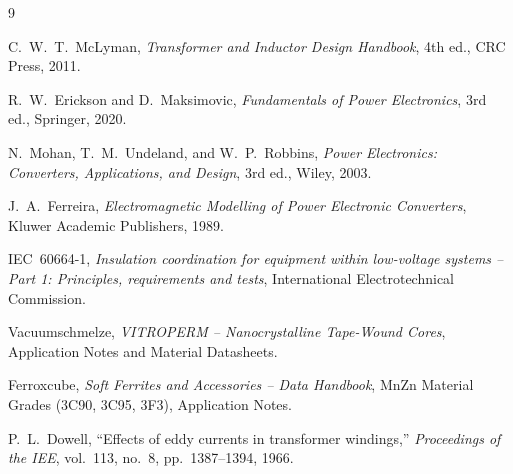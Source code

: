 \documentclass[11pt,a4paper]{article}
\begin{document}
\begin{thebibliography}{9}

C.~W.~T.~McLyman, \textit{Transformer and Inductor Design Handbook}, 4th ed.,
CRC Press, 2011.

R.~W.~Erickson and D.~Maksimovic, \textit{Fundamentals of Power Electronics},
3rd ed., Springer, 2020.

N.~Mohan, T.~M.~Undeland, and W.~P.~Robbins, \textit{Power Electronics:
Converters, Applications, and Design}, 3rd ed., Wiley, 2003.

J.~A.~Ferreira, \textit{Electromagnetic Modelling of Power Electronic
Converters}, Kluwer Academic Publishers, 1989.

IEC~60664-1, \textit{Insulation coordination for equipment within low-voltage
systems -- Part 1: Principles, requirements and tests}, International
Electrotechnical Commission.

Vacuumschmelze, \textit{VITROPERM -- Nanocrystalline Tape-Wound Cores},
Application Notes and Material Datasheets.

Ferroxcube, \textit{Soft Ferrites and Accessories -- Data Handbook}, MnZn
Material Grades (3C90, 3C95, 3F3), Application Notes.

P.~L.~Dowell, ``Effects of eddy currents in transformer windings,'' \textit{
Proceedings of the IEE}, vol.~113, no.~8, pp.~1387--1394, 1966.

\end{thebibliography}
\end{document}
